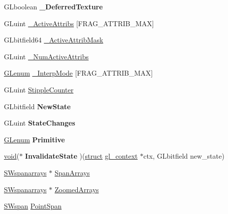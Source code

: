 \begin{DoxyCompactItemize}
\mbox{\label{struct_s_wcontext_a6cab1dfcf882762b12d35f6dd51c2f06}} 
G\+Lboolean {\bfseries \+\_\+\+Deferred\+Texture}
\item 
G\+Luint \hyperlink{struct_s_wcontext_a653cad931592d10b3e6ef19e7e384adc}{\+\_\+\+Active\+Attribs} \mbox{[}F\+R\+A\+G\+\_\+\+A\+T\+T\+R\+I\+B\+\_\+\+M\+AX\mbox{]}
\item 
G\+Lbitfield64 \hyperlink{struct_s_wcontext_adb8d34b28b62e801d44b46484391c89f}{\+\_\+\+Active\+Attrib\+Mask}
\item 
G\+Luint \hyperlink{struct_s_wcontext_ab03f1163c48935366e13e75248b8f67a}{\+\_\+\+Num\+Active\+Attribs}
\item 
\hyperlink{interfacevoid}{G\+Lenum} \hyperlink{struct_s_wcontext_ad59daf2ae1af19c2b09fe90a273971ca}{\+\_\+\+Interp\+Mode} \mbox{[}F\+R\+A\+G\+\_\+\+A\+T\+T\+R\+I\+B\+\_\+\+M\+AX\mbox{]}
\item 
G\+Luint \hyperlink{struct_s_wcontext_a8318f169b67f742b63fc3cd23f977f1c}{Stipple\+Counter}
\item 
\mbox{\label{struct_s_wcontext_af44762626eb8ac14fa1f909ea6bd8bd8}} 
G\+Lbitfield {\bfseries New\+State}
\item 
\mbox{\label{struct_s_wcontext_ac9e606c2298a3f5feba76ba226817759}} 
G\+Luint {\bfseries State\+Changes}
\item 
\mbox{\label{struct_s_wcontext_a3233ddb174395d328660ece403e4369b}} 
\hyperlink{interfacevoid}{G\+Lenum} {\bfseries Primitive}
\item 
\mbox{\label{struct_s_wcontext_acc0a8f501e14a56750c091182f85545d}} 
\hyperlink{interfacevoid}{void}($\ast$ {\bfseries Invalidate\+State} )(\hyperlink{interfacestruct}{struct} \hyperlink{structgl__context}{gl\+\_\+context} $\ast$ctx, G\+Lbitfield new\+\_\+state)
\item 
\hyperlink{structsw__span__arrays}{S\+Wspanarrays} $\ast$ \hyperlink{struct_s_wcontext_af008f2ef3faa86a7f22b5821708f0367}{Span\+Arrays}
\item 
\hyperlink{structsw__span__arrays}{S\+Wspanarrays} $\ast$ \hyperlink{struct_s_wcontext_a353abb5ab97460323cbc47f335b5d34e}{Zoomed\+Arrays}
\item 
\hyperlink{structsw__span}{S\+Wspan} \hyperlink{struct_s_wcontext_a48d01783b4f7429df1a061ff2a0e93a8}{Point\+Span}

\end{DoxyCompactItemize}
